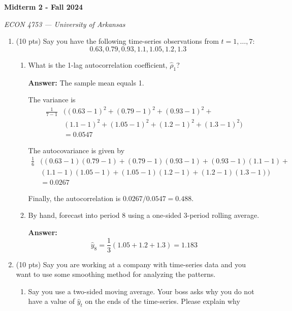 \documentclass[12pt]{article}
\newcommand{\answer}[1]{{\color{blue_winged_teal}\textbf{Answer:} #1}}
\newcommand{\pts}[1]{{\color{zinc500}(#1 pts)}}
\begin{document}
\begin{center}
  {\Huge\bf Midterm 2 - Fall 2024}
  
  \smallskip
  {\large\it  ECON 4753 — University of Arkansas}
\end{center}

\vspace{5mm}
\begin{enumerate}
  \item \pts{10} Say you have the following time-series observations from $t = 1, \dots, 7$:
  \vspace*{-\bigskipamount}
  $$
    0.63, 0.79, 0.93, 1.1, 1.05, 1.2, 1.3
  $$

  \begin{enumerate}
    \item What is the 1-lag autocorrelation coefficient, $\hat{\rho}_1$?
    
    \answer{
      The sample mean equals 1.

      The variance is
      \begin{align*}
        \frac{1}{7 - 1} &\big( 
        (0.63 - 1)^2 + (0.79 - 1)^2 + (0.93 - 1)^2 + \\
        &(1.1 - 1)^2 + (1.05 - 1)^2 + (1.2 - 1)^2 + (1.3 - 1)^2 \big) \\
        &= 0.0547
      \end{align*}

      The autocovariance is given by 
      \begin{align*}
        \frac{1}{6} &\big( 
        (0.63 - 1) (0.79 - 1) + (0.79 - 1) (0.93 - 1) + (0.93 - 1) (1.1 - 1) + \\
        &(1.1 - 1) (1.05 - 1) + (1.05 - 1) (1.2 - 1) + (1.2 - 1) (1.3 - 1) \big) \\
        &= 0.0267
      \end{align*}

      Finally, the autocorrelation is $0.0267 / 0.0547 = 0.488$.
    }
      
    \item By hand, forecast into period $8$ using a one-sided 3-period rolling average.

    \answer{
      $$
        \hat{y}_{8} = \frac{1}{3} (1.05 + 1.2 + 1.3) = 1.183
      $$
    }
  \end{enumerate}
  
  \item \pts{10} Say you are working at a company with time-series data and you want to use some smoothing method for analyzing the patterns. 
  \begin{enumerate}
    \item Say you use a two-sided moving average. Your boss asks why you do not have a value of $\hat{y}_t$ on the ends of the time-series. Please explain why
    

\end{enumerate}
\end{enumerate}
\end{document}
